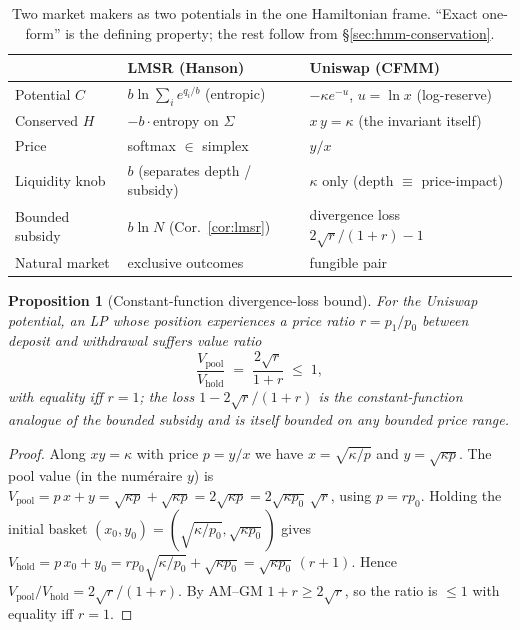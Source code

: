 \documentclass[11pt]{article}
\newtheorem{proposition}[theorem]{Proposition}
\begin{document}
\begin{table}[H]
\centering
\caption{Two market makers as two potentials in the one Hamiltonian frame. ``Exact
one-form'' is the defining property; the rest follow from \S\ref{sec:hmm-conservation}.}
\label{tab:unify}
\begin{tabular}{p{2.5cm} p{3.5cm} p{3.5cm}}
\toprule
 & \textbf{LMSR (Hanson)} & \textbf{Uniswap (CFMM)} \\
\midrule
Potential $C$        & $b\ln\sum_i e^{q_i/b}$ (entropic) & $-\kappa e^{-u}$, $u=\ln x$ (log-reserve) \\
\addlinespace
Conserved $H$        & $-b\cdot$entropy on $\Sigma$ & $x\,y=\kappa$ (the invariant itself) \\
\addlinespace
Price                & softmax $\in$ simplex & $y/x$ \\
\addlinespace
Liquidity knob       & $b$ (separates depth / subsidy) & $\kappa$ only (depth $\equiv$ price-impact) \\
\addlinespace
Bounded subsidy      & $b\ln N$ (Cor.~\ref{cor:lmsr}) & divergence loss $2\sqrt r/(1{+}r)-1$ \\
\addlinespace
Natural market       & exclusive outcomes & fungible pair \\
\bottomrule
\end{tabular}
\end{table}

\begin{proposition}[Constant-function divergence-loss bound]
\label{prop:uniloss}
For the Uniswap potential, an LP whose position experiences a price ratio
$r = p_1/p_0$ between deposit and withdrawal suffers value ratio
\begin{equation}
\frac{V_{\text{pool}}}{V_{\text{hold}}} \;=\; \frac{2\sqrt r}{1+r} \;\le\; 1,
\end{equation}
with equality iff $r=1$; the loss $1 - 2\sqrt r/(1+r)$ is the constant-function
analogue of the bounded subsidy and is itself bounded on any bounded price range.
\end{proposition}

\begin{proof}
Along $xy=\kappa$ with price $p=y/x$ we have $x=\sqrt{\kappa/p}$ and
$y=\sqrt{\kappa p}$. The pool value (in the numéraire $y$) is
$V_{\text{pool}}=p\,x+y = \sqrt{\kappa p}+\sqrt{\kappa p}=2\sqrt{\kappa p}
= 2\sqrt{\kappa p_0}\,\sqrt r$, using $p=r p_0$. Holding the initial basket
$(x_0,y_0)=(\sqrt{\kappa/p_0},\sqrt{\kappa p_0})$ gives
$V_{\text{hold}} = p\,x_0+y_0 = r p_0\sqrt{\kappa/p_0}+\sqrt{\kappa p_0}
= \sqrt{\kappa p_0}\,(r+1)$. Hence
$V_{\text{pool}}/V_{\text{hold}} = 2\sqrt r/(1+r)$. By AM--GM $1+r\ge 2\sqrt r$, so
the ratio is $\le 1$ with equality iff $r=1$.
\end{proof}
\end{document}
